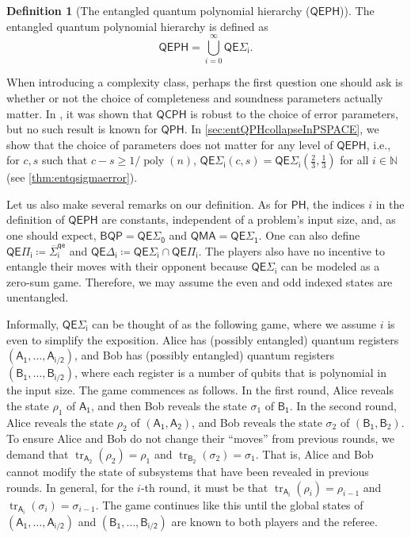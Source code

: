\documentclass[10pt,a4paper]{article}
\theoremstyle{definition}
\newtheorem{definition}[theorem]{Definition}
\DeclareMathOperator{\tr}{tr}
\DeclareMathOperator{\poly}{poly}
\newcommand{\nats}{\mathbb N}
\newcommand{\N}{\nats}
\newcommand{\class}[1]{\ensuremath{\mathsf{#1}}\xspace}
\newcommand{\BQP}{\class{BQP}}
\newcommand{\QMA}{\class{QMA}}
\newcommand{\PH}{\class{PH}}
\newcommand{\QCPH}{\class{QCPH}}
\newcommand{\QPH}{\class{QPH}}
\newcommand{\QEPH}{\class{QEPH}}
\newcommand{\entQSigmai}[1][i]{\class{QE\Sigma_{#1}}}
\newcommand{\entQPii}[1][i]{\class{QE\Pi_{#1}}}
\newcommand{\entQDeltai}[1][i]{\class{QE\Delta_{#1}}}
\newcommand{\qreg}[1]{\mathsf{#1}}
\begin{document}
\begin{definition}[The entangled quantum polynomial hierarchy ($\QEPH$)]\label{def:entqph}
    The entangled quantum polynomial hierarchy is defined as 
    \[\QEPH = \bigcup_{i = 0}^{\infty} \entQSigmai[i].\]
\end{definition}

When introducing a complexity class, perhaps the first question one should ask is whether or not the choice of completeness and soundness parameters actually matter. 
In \cite[Theorem 2.6]{GSSSY22_qph}, it was shown that $\QCPH$ is robust to the choice of error parameters, but no such result is known for $\QPH$.
In \cref{sec:entQPHcollapseInPSPACE}, we show that the choice of parameters does not matter for any level of $\QEPH$, i.e., for $c, s$ such that $c-s \geq 1/\poly(n)$, $\entQSigmai(c,s) = \entQSigmai(\frac{2}{3}, \frac{1}{3})$ for all $i \in \N$ (see \cref{thm:entqsigmaerror}).

Let us also make several remarks on our definition. 
As for $\PH$, the indices $i$ in the definition of $\QEPH$ are constants, independent of a problem's input size, and, as one should expect, $\BQP = \entQSigmai[0]$ and $\QMA=\entQSigmai[1]$. 
One can also define $\entQPii[i] \coloneqq \class{\overline{\Sigma}_i^{qe}}$ and $\entQDeltai[i] \coloneqq \entQSigmai \cap \entQPii$. 
The players also have no incentive to entangle their moves with their opponent because $\entQSigmai$ can be modeled as a zero-sum game. 
Therefore, we may assume the even and odd indexed states are unentangled. 


Informally, $\entQSigmai$ can be thought of as the following game, where we assume $i$ is even to simplify the exposition.
Alice has (possibly entangled) quantum registers $(\qreg{A_1}, \ldots, \qreg{A_{i/2}})$,
and Bob has (possibly entangled) quantum registers $(\qreg{B_1}, \ldots, \qreg{B_{i/2}})$,
where each register is a number of qubits that is polynomial in the input size. 
The game commences as follows. In the first round, Alice reveals the state $\rho_1$ of $\qreg{A_1}$, and then Bob reveals the state $\sigma_1$ of $\qreg{B_1}$. 
In the second round, Alice reveals the state $\rho_2$ of $(\qreg{A_1}, \qreg{A_2})$, and Bob reveals the state $\sigma_2$ of $(\qreg{B_1}, \qreg{B}_2)$. 
To ensure Alice and Bob do not change their ``moves'' from previous rounds, we demand that $\tr_{\qreg{A_2}}(\rho_2) = \rho_1$ and $\tr_{\qreg{B_2}}(\sigma_2) = \sigma_1$. That is, Alice and Bob cannot modify the state of subsystems that have been revealed in previous rounds. 
In general, for the $i$-th round, it must be that 
$\tr_{\qreg{A_i}}(\rho_i) = \rho_{i-1}$ and 
$\tr_{\qreg{A_i}}(\sigma_i) = \sigma_{i-1}$.
The game continues like this until the global states of $(\qreg{A_1}, \ldots, \qreg{A_{i/2}})$  and $(\qreg{B_1}, \ldots, \qreg{B_{i/2}})$ are known to both players and the referee. 
\end{document}
